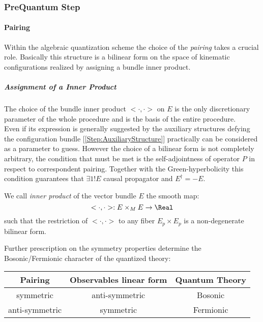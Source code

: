 \documentclass[Main]{subfiles}
\begin{document}
	\subsubsection{PreQuantum Step}%
		\paragraph{Pairing}\label{Paragraph:Pairing Construction}
				Within the algebraic quantization scheme the choice of the \emph{pairing} takes a crucial role.
				Basically this structure is a bilinear form on the space of kinematic configurations realized by assigning a bundle inner product.

			\subparagraph{Assignment of a Inner Product}
				The choice of the bundle inner product  $<\cdot,\cdot>$ on $E$ is the only discretionary parameter of the whole procedure and is the basis of the entire procedure.\\
				Even if its expression is generally suggested by the auxiliary structures defying the configuration bundle [\ref{Step:AuxiliaryStructure}] practically can be considered as a parameter to guess. 
				However the choice of a bilinear form is not completely arbitrary, the condition that must be met is the self-adjointness of operator $P$ in respect to correspondent pairing.
				Together with the Green-hyperbolicity this condition guarantees that $\exists 1! E$ causal propagator and $E^\dagger =  -E$.
			\begin{definition}
				We call \emph{inner product} of the vector bundle $E$ the smooth map:
				\begin{displaymath}
					<\cdot,\cdot> : E \times_M E \rightarrow \Real
				\end{displaymath}
				such that the restriction of $<\cdot,\cdot>$ to any fiber $E_p\times E_p$ is a non-degenerate bilinear form.
			\end{definition}

				Further prescription on the symmetry properties determine the Bosonic/Fermionic character of the quantized theory:\\
				\begin{tabular}{|c | c | c|}
					\hline
					Pairing & Observables linear form & Quantum Theory\\
					\hline
					symmetric  & anti-symmetric &  Bosonic \\
					anti-symmetric & symmetric & Fermionic \\
					\hline
				\end{tabular}		
\end{document}
